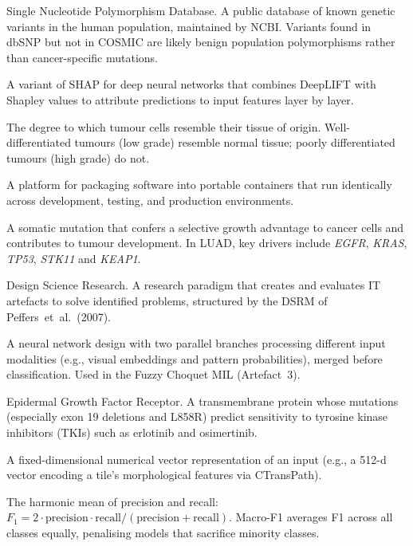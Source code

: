 \begin{description}[style=nextline,leftmargin=4cm]
\item[dbSNP] Single Nucleotide Polymorphism Database.  A public database of known genetic variants in the human population, maintained by NCBI.  Variants found in dbSNP but not in COSMIC are likely benign population polymorphisms rather than cancer-specific mutations.


\item[DeepSHAP] A variant of SHAP for deep neural networks that combines DeepLIFT with Shapley values to attribute predictions to input features layer by layer.


\item[Differentiation] The degree to which tumour cells resemble their tissue of origin.  Well-differentiated tumours (low grade) resemble normal tissue; poorly differentiated tumours (high grade) do not.


\item[Docker] A platform for packaging software into portable containers that run identically across development, testing, and production environments.


\item[Driver mutation] A somatic mutation that confers a selective growth advantage to cancer cells and contributes to tumour development.  In LUAD, key drivers include \emph{EGFR}, \emph{KRAS}, \emph{TP53}, \emph{STK11} and \emph{KEAP1}.


\item[DSR] Design Science Research.  A research paradigm that creates and evaluates IT artefacts to solve identified problems, structured by the DSRM of Peffers~et~al.~(2007).


\item[Dual-pathway architecture] A neural network design with two parallel branches processing different input modalities (e.g., visual embeddings and pattern probabilities), merged before classification.  Used in the Fuzzy Choquet MIL (Artefact~3).


\item[EGFR] Epidermal Growth Factor Receptor.  A transmembrane protein whose mutations (especially exon 19 deletions and L858R) predict sensitivity to tyrosine kinase inhibitors (TKIs) such as erlotinib and osimertinib.


\item[Embedding] A fixed-dimensional numerical vector representation of an input (e.g., a 512-d vector encoding a tile's morphological features via CTransPath).


\item[F1 score / Macro-F1] The harmonic mean of precision and recall: $F_1 = 2 \cdot \text{precision} \cdot \text{recall} / (\text{precision} + \text{recall})$.  Macro-F1 averages F1 across all classes equally, penalising models that sacrifice minority classes.



\end{description}
